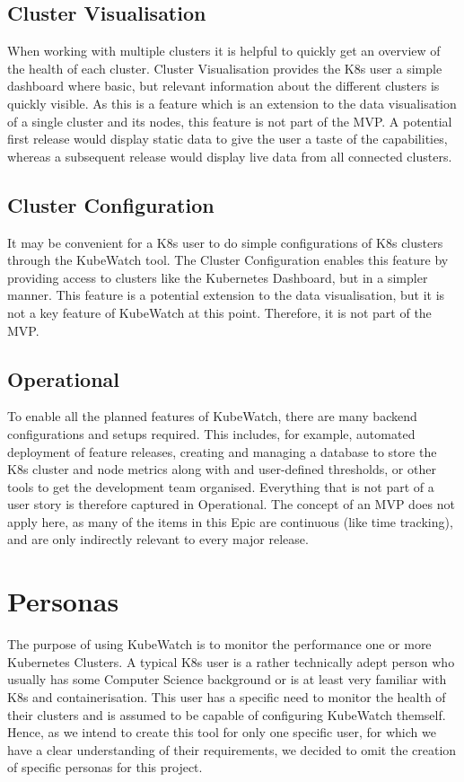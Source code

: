 \subsection{Cluster Visualisation}
When working with multiple clusters it is helpful to quickly get an overview of the health of each cluster. Cluster Visualisation provides the K8s user a simple dashboard where basic, but relevant information about the different clusters is quickly visible. As this is a feature which is an extension to the data visualisation of a single cluster and its nodes, this feature is not part of the MVP. A potential first release would display static data to give the user a taste of the capabilities, whereas a subsequent release would display live data from all connected clusters.

\subsection{Cluster Configuration}
It may be convenient for a K8s user to do simple configurations of K8s clusters through the KubeWatch tool. The Cluster Configuration enables this feature by providing access to clusters like the Kubernetes Dashboard, but in a simpler manner. This feature is a potential extension to the data visualisation, but it is not a key feature of KubeWatch at this point. Therefore, it is not part of the MVP.

\subsection{Operational}
To enable all the planned features of KubeWatch, there are many backend configurations and setups required. This includes, for example, automated deployment of feature releases, creating and managing a database to store the K8s cluster and node metrics along with and user-defined thresholds, or other tools to get the development team organised. Everything that is not part of a user story is therefore captured in Operational. The concept of an MVP does not apply here, as many of the items in this Epic are continuous (like time tracking), and are only indirectly relevant to every major release.

\section{Personas}

The purpose of using KubeWatch is to monitor the performance one or more Kubernetes Clusters. A typical K8s user is a rather technically adept person who usually has some Computer Science background or is at least very familiar with K8s and containerisation. This user has a specific need to monitor the health of their clusters and is assumed to be capable of configuring KubeWatch themself. Hence, as we intend to create this tool for only one specific user, for which we have a clear understanding of their requirements, we decided to omit the creation of specific personas for this project. 